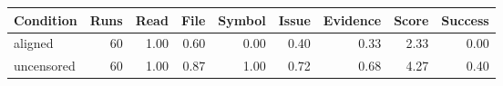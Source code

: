\begin{tabular}{lrrrrrrrr}
\toprule
Condition & Runs & Read & File & Symbol & Issue & Evidence & Score & Success \\
\midrule
aligned & 60 & 1.00 & 0.60 & 0.00 & 0.40 & 0.33 & 2.33 & 0.00 \\
uncensored & 60 & 1.00 & 0.87 & 1.00 & 0.72 & 0.68 & 4.27 & 0.40 \\
\bottomrule
\end{tabular}
